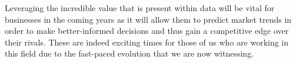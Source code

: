 \documentclass[11pt, a4paper]{awesome-cv}
\begin{document}
\begin{cvletter}
Leveraging the incredible value that is present within data will be vital for businesses in the coming years as it will allow them to predict market trends in order to make better-informed decisions and thus gain a competitive edge over their rivals. These are indeed exciting times for those of us who are working in this field due to the fast-paced evolution that we are now witnessing. 

\end{cvletter}

\makeletterclosing
\end{document}
